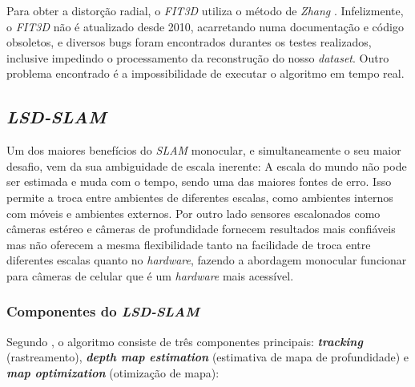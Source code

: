  Para obter a distorção radial, o \textit{FIT3D} utiliza o método de \textit{Zhang} \cite{FIT3D}. Infelizmente, o \textit{FIT3D} não é atualizado desde 2010, acarretando numa documentação e código obsoletos, e diversos bugs foram encontrados durantes os testes realizados, inclusive impedindo o processamento da reconstrução do nosso \textit{dataset}. Outro problema encontrado é a impossibilidade de executar o algoritmo em tempo real.

\subsection{\textit{LSD-SLAM}}

Um dos maiores benefícios do \textit{SLAM} monocular, e simultaneamente o seu maior desafio, vem da sua ambiguidade de escala inerente: A escala do mundo não pode ser estimada e muda com o tempo, sendo uma das maiores fontes de erro. Isso permite a troca entre ambientes de diferentes escalas, como ambientes internos com móveis e ambientes externos. Por outro lado sensores escalonados como câmeras estéreo e câmeras de profundidade fornecem resultados mais confiáveis mas não oferecem a mesma flexibilidade tanto na facilidade de troca entre diferentes escalas quanto no \textit{hardware}, fazendo a abordagem monocular funcionar para câmeras de celular que é um \textit{hardware} mais acessível. 

\subsubsection{Componentes do \textit{LSD-SLAM}}

Segundo \cite{LSD-SLAM-Artigo}, o algoritmo consiste de três componentes principais: \textbf{\textit{tracking}} (rastreamento), \textbf{\textit{depth map estimation}} (estimativa de mapa de profundidade) e \textbf{\textit{map optimization}} (otimização de mapa):

